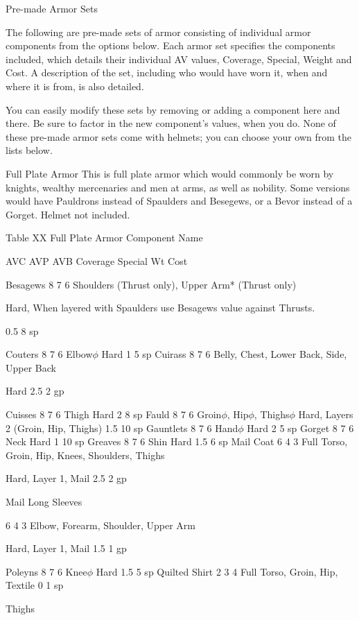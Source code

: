 \documentclass[oneside,11pt,english]{book}
\begin{document}
 

Pre-made Armor Sets 

 

The following are pre-made sets of armor consisting of individual armor components from the options 
below. Each armor set specifies the components included, which details their individual AV values, 
Coverage, Special, Weight and Cost. A description of the set, including who would have worn it, when 
and where it is from, is also detailed. 

 

You can easily modify these sets by removing or adding a component here and there. Be sure to factor in 
the new component’s values, when you do. None of these pre-made armor sets come with helmets; you 
can choose your own from the lists below. 

 

Full Plate Armor 
This is full plate armor which would commonly be worn by knights, wealthy mercenaries and men at 
arms, as well as nobility. Some versions would have Pauldrons instead of Spaulders and Besegews, or a 
Bevor instead of a Gorget. Helmet not included. 

 
Table XX Full Plate Armor 
Component 
Name 

AVC AVP AVB Coverage Special Wt Cost 

Besagews 8 7 6 Shoulders (Thrust only), 
Upper Arm* (Thrust only) 

Hard, When layered with Spaulders use 
Besagews value against Thrusts. 

0.5 8 sp 

Couters 8 7 6 Elbow$\phi$ Hard 1 5 sp 
Cuirass 8 7 6 Belly, Chest, Lower Back, 
Side, Upper Back 

Hard 2.5 2 gp 

Cuisses 8 7 6 Thigh Hard 2 8 sp 
Fauld 8 7 6 Groin$\phi$, Hip$\phi$, Thighs$\phi$ Hard, Layers 2 (Groin, Hip, Thighs) 1.5 10 
sp 
Gauntlets 8 7 6 Hand$\phi$ Hard 2 5 sp 
Gorget 8 7 6 Neck Hard 1 10 
sp 
Greaves 8 7 6 Shin Hard 1.5 6 sp 
Mail Coat 6 4 3 Full Torso, Groin, Hip, 
Knees, Shoulders, Thighs 

Hard, Layer 1, Mail 2.5 2 gp 

Mail Long 
Sleeves 

6 4 3 Elbow, Forearm, Shoulder, 
Upper Arm 

Hard, Layer 1, Mail 1.5 1 gp 

Poleyns 8 7 6 Knee$\phi$ Hard 1.5 5 sp 
Quilted Shirt 2 3 4 Full Torso, Groin, Hip, Textile 0 1 sp 


Thighs 
\end{document}
